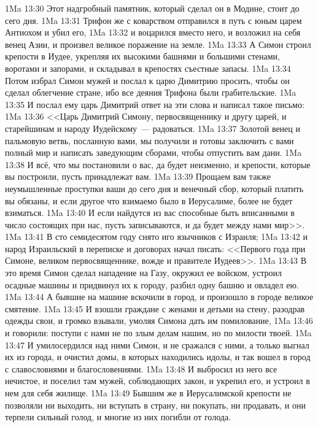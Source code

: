 \vs 1Ma 13:30 Этот надгробный памятник, который сделал он в Модине, стоит до сего дня.
\rsbpar\vs 1Ma 13:31 Трифон же с коварством отправился в путь с юным царем Антиохом и убил его,
\vs 1Ma 13:32 и воцарился вместо него, и возложил на себя венец Азии, и произвел великое поражение на земле.
\vs 1Ma 13:33 А Симон строил крепости в Иудее, укрепляя их высокими башнями и большими стенами, воротами и запорами, и складывал в крепостях съестные запасы.
\vs 1Ma 13:34 Потом избрал Симон мужей и послал к царю Димитрию просить, чтобы он сделал облегчение стране, ибо все деяния Трифона были грабительские.
\vs 1Ma 13:35 И послал ему царь Димитрий ответ на эти слова и написал такое письмо:
\vs 1Ma 13:36 <<Царь Димитрий Симону, первосвященнику и другу царей, и старейшинам и народу Иудейскому~--- радоваться.
\vs 1Ma 13:37 Золотой венец и пальмовую ветвь, посланную вами, мы получили и готовы заключить с вами полный мир и написать заведующим сборами, чтобы отпустить вам дани.
\vs 1Ma 13:38 И всё, что мы постановили о вас, да будет неизменно, и крепости, которые вы построили, пусть принадлежат вам.
\vs 1Ma 13:39 Прощаем вам также неумышленные проступки ваши до сего дня и венечный сбор, который платить вы обязаны, и если другое что взимаемо было в Иерусалиме, более не будет взиматься.
\vs 1Ma 13:40 И если найдутся из вас способные быть вписанными в число состоящих при нас, пусть записываются, и да будет между нами мир>>.
\rsbpar\vs 1Ma 13:41 В сто семидесятом году снято иго язычников с Израиля;
\vs 1Ma 13:42 и народ Израильский в переписке и договорах начал писать: <<Первого года при Симоне, великом первосвященнике, вожде и правителе Иудеев>>.
\vs 1Ma 13:43 В это время Симон сделал нападение на Газу, окружил ее войском, устроил осадные машины и придвинул их к городу, разбил одну башню и овладел ею.
\vs 1Ma 13:44 А бывшие на машине вскочили в город, и произошло в городе великое смятение.
\vs 1Ma 13:45 И взошли граждане с женами и детьми на стену, разодрав одежды свои, и громко взывали, умоляя Симона дать им помилование,
\vs 1Ma 13:46 и говорили: поступи с нами не по злым делам нашим, но по милости твоей.
\vs 1Ma 13:47 И умилосердился над ними Симон, и не сражался с ними, а только выгнал их из города, и очистил домы, в которых находились идолы, и так вошел в город с славословиями и благословениями.
\vs 1Ma 13:48 И выбросил из него все нечистое, и поселил там мужей, соблюдающих закон, и укрепил его, и устроил в нем для себя жилище.
\vs 1Ma 13:49 Бывшим же в Иерусалимской крепости не позволяли ни выходить, ни вступать в страну, ни покупать, ни продавать, и они терпели сильный голод, и многие из них погибли от голода.
